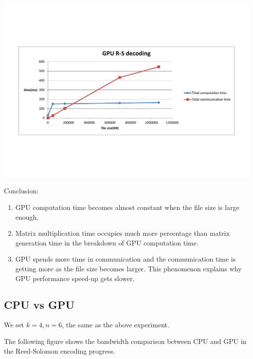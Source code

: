 \documentclass[a4paper]{article}
\begin{document}
\includegraphics[scale=0.42]{result-graph/GPU-RS-decode.pdf}

Conclusion:
\begin{enumerate}
\item GPU computation time becomes almost constant when the file size is large enough.
\item Matrix multiplication time occupies much more percentage than matrix generation time in the breakdown of GPU computation time.
\item GPU spends more time in communication and the communication time is getting more as the file size becomes larger. This phenomenon explains why GPU performance speed-up gets slower.
\end{enumerate}

\subsection{CPU vs GPU}

We set $k=4, n=6$, the same as the above experiment.

The following figure shows the bandwidth comparison between CPU and GPU in the Reed-Solomon encoding progress.
\end{document}
